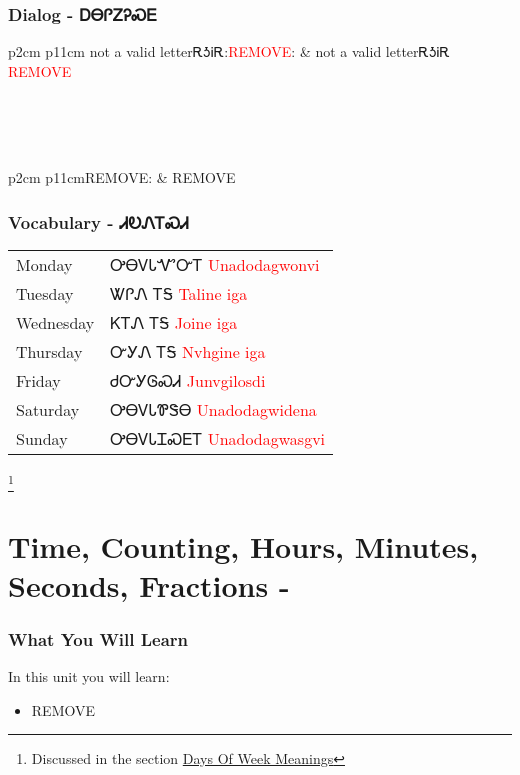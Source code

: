 \newpage\subsection{Dialog - ᎠᎾᎵᏃᎮᏍᎬ}
\begin{tabular}{p{2cm} p{11cm}}
not a valid letterᎡᎼᎥᎡ:\newline \textcolor{red}{REMOVE}: & not a valid letterᎡᎼᎥᎡ 
\newline\textcolor{red}{REMOVE}\\
\end{tabular}
\\
\\
\\
\noindent\begin{tabular}{p{2cm} p{11cm}}REMOVE: & REMOVE\\
\end{tabular}
\vfill\newpage\subsection{Vocabulary - ᏗᎧᏁᎢᏍᏗ 
}
\begin{minipage}{\linewidth}
\begin{tabular}{p{3cm} p{11cm}}
Monday & ᎤᎾᏙᏓᏉᏅᎢ 
 \newline \textcolor{red}{Unadodagwonvi}\\
Tuesday & ᏔᎵᏁ ᎢᎦ 
 \newline \textcolor{red}{Taline iga}\\
Wednesday & ᏦᎢᏁ ᎢᎦ 
 \newline \textcolor{red}{Joine iga}\\
Thursday & ᏅᎩᏁ ᎢᎦ 
 \newline \textcolor{red}{Nvhgine iga}\\
Friday & ᏧᏅᎩᎶᏍᏗ 
 \newline \textcolor{red}{Junvgilosdi}\\
Saturday & ᎤᎾᏙᏓᏈᏕᎾ 
 \newline \textcolor{red}{Unadodagwidena}\\
Sunday & ᎤᎾᏙᏓᏆᏍᎬᎢ 
 \newline \textcolor{red}{Unadodagwasgvi}\\
\end{tabular}
\end{minipage}

\footnote{Discussed in the section \hyperref[sec:daysOfWeekMeaning]{Days Of Week Meanings}}
\index{}
\chapter{Time, Counting, Hours, Minutes, Seconds, Fractions - }
\subsection{What You Will Learn}
In this unit you will learn:
\begin{itemize}
\item REMOVE
\end{itemize}\newpage

